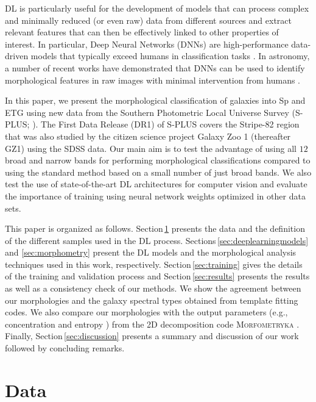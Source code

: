 \documentclass[fleqn,usenatbib]{mnras}
\begin{document}
DL is particularly useful for the development of models that can process complex and minimally reduced (or even raw) data from different sources and extract relevant features that can then be effectively linked to other properties of interest. In particular, Deep Neural Networks (DNNs) are high-performance data-driven models that typically exceed humans in classification tasks \citep{challenge01}. In astronomy, a number of recent works have demonstrated that DNNs can be used to identify morphological features in raw images with minimal intervention from humans \citep{10.1093/mnras/stx1492,Farias2020,hausen2020morpheus,lanusse2018cmu,2019arXiv191104320C,2019MNRAS.484.5330J,2019MNRAS.482..807P,2019MNRAS.484.3879P,challenge01,s2019modular,Barchi2020}.

In this paper, we present the morphological classification of galaxies into Sp and ETG using new data from the Southern Photometric Local Universe Survey (S-PLUS; \citealt{mendes_de_oliveira2019}). 
The First Data Release (DR1) of S-PLUS covers the Stripe-82 region that was also studied by the citizen science project Galaxy Zoo 1 (thereafter GZ1) using the SDSS data.  Our main aim is to test the advantage of using all $12$ broad and narrow bands for performing morphological classifications compared to using the standard method based on a small number of just broad bands. We also test the use of state-of-the-art DL architectures for computer vision and evaluate the importance of training using neural network weights  optimized in other data sets.

This paper is organized as follows. 
Section\,\ref{sec:data} presents the data and the definition of the different samples used in the DL process. Sections\,\ref{sec:deeplearningmodels} and \ref{sec:morphometry} present the DL models and the morphological analysis techniques used in this work, respectively. Section\,\ref{sec:training} gives the details of the training and validation process and Section\,\ref{sec:results} presents the results as well as a consistency check of our methods. We show the agreement between our morphologies and the galaxy spectral types obtained from template fitting codes. We also compare our  morphologies with the output parameters (e.g.,  concentration and entropy  ) from the 2D decomposition code \textsc{Morfometryka} \citep{Ferrari_2015}. Finally, Section\,\ref{sec:discussion} presents a summary and discussion of our work followed by concluding remarks.



\section{Data}
\label{sec:data}
\end{document}
